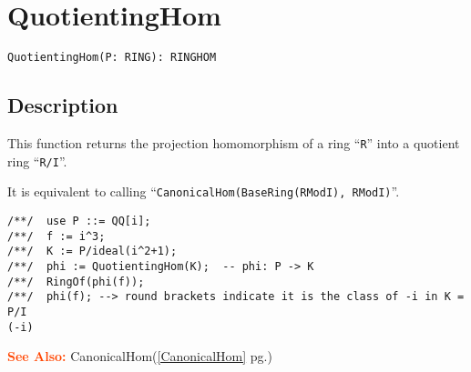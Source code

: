 \documentclass[a4paper]{mybook}
\newenvironment{command}{}{} %
\newcommand\SeeAlso{\par\textcolor{OrangeRed}{\textbf{\large See Also: }}}
\begin{document}
\section{QuotientingHom}
\label{QuotientingHom}
\begin{command} %


\begin{Verbatim}[label=syntax, rulecolor=\color{MidnightBlue},
frame=single]
QuotientingHom(P: RING): RINGHOM
\end{Verbatim}


\subsection*{Description}

This function returns the projection homomorphism of a ring ``\verb&R&'' into 
a quotient ring ``\verb&R/I&''.
\par 
It is equivalent to calling ``\verb&CanonicalHom(BaseRing(RModI), RModI)&''.
\begin{Verbatim}[label=example, rulecolor=\color{PineGreen}, frame=single]
/**/  use P ::= QQ[i];
/**/  f := i^3;
/**/  K := P/ideal(i^2+1);
/**/  phi := QuotientingHom(K);  -- phi: P -> K
/**/  RingOf(phi(f));
/**/  phi(f); --> round brackets indicate it is the class of -i in K = P/I
(-i)
\end{Verbatim}


\SeeAlso %
  CanonicalHom(\ref{CanonicalHom} pg.\pageref{CanonicalHom})
\end{command} %
\end{document}
